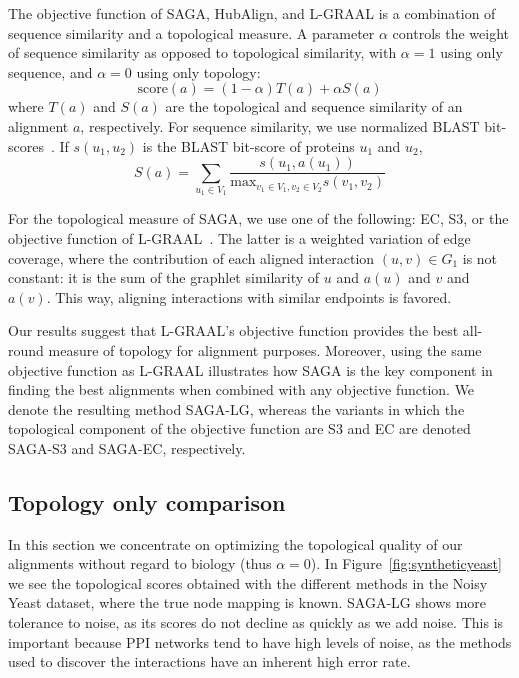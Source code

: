 \documentclass{bioinfo}
\begin{document}
The objective function of SAGA, HubAlign, and L-GRAAL is a combination of sequence similarity and a topological measure. A parameter $\alpha$ controls the weight of sequence similarity as opposed to topological similarity, with $\alpha=1$ using only sequence, and $\alpha=0$ using only topology:
\begin{equation}
\mbox{score}(a) = (1-\alpha)T(a) + \alpha S(a)\label{eq:alpha}
\end{equation}
where $T(a)$ and $S(a)$ are the topological and sequence similarity of an alignment $a$, respectively. For sequence similarity, we use normalized BLAST bit-scores~\citep{blast}. If $s(u_1,u_2)$ is the BLAST bit-score of proteins $u_1$ and $u_2$,
$$S(a)=\sum_{u_1\in V_1} \frac{s(u_1,a(u_1))}{\mbox{max}_{v_1\in V_1,v_2\in V_2}s(v_1,v_2)}$$

For the topological measure of SAGA, we use one of the following: EC, S3, or the objective function of L-GRAAL~\citep{LGRAAL}. The latter is a weighted variation of edge coverage, where the contribution of each aligned interaction $(u,v)\in G_1$ is not constant: it is the sum of the graphlet similarity of $u$ and $a(u)$ and $v$ and $a(v)$. This way, aligning interactions with similar endpoints is favored.

Our results suggest that L-GRAAL's objective function provides the best all-round measure of topology for alignment purposes. Moreover, using the same objective function as L-GRAAL illustrates how SAGA is the key component in finding the best alignments when combined with any objective function. We denote the resulting method SAGA-LG, whereas the variants in which the topological component of the objective function are S3 and EC are denoted SAGA-S3 and SAGA-EC, respectively.

\subsection{Topology only comparison}\label{top}

In this section we concentrate on optimizing the topological quality of our alignments without regard to biology (thus $\alpha=0$).
In Figure~\ref{fig:syntheticyeast} we see the topological scores obtained with the different methods in the Noisy Yeast dataset, where the true node mapping is known. SAGA-LG shows more tolerance to noise, as its scores do not decline as quickly as we add noise. This is important because PPI networks tend to have high levels of noise, as the methods used to discover the interactions have an inherent high error rate.
\end{document}

